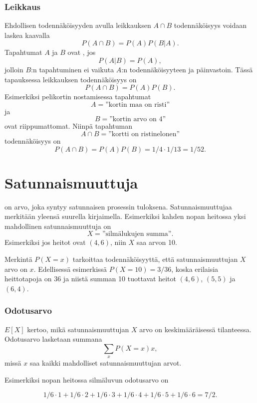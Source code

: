 \subsubsection{Leikkaus}


Ehdollisen todennäköisyyden avulla
leikkauksen $A \cap B$ todennäköisyys
voidaan laskea kaavalla
\[P(A \cap B)=P(A)P(B|A).\]
Tapahtumat $A$ ja $B$ ovat , jos
\[P(A|B)=P(A),\]
jolloin $B$:n tapahtuminen ei vaikuta $A$:n
todennäköisyyteen ja päinvastoin.
Tässä tapauksessa leikkauksen
todennäköisyys on
\[P(A \cap B)=P(A)P(B).\]
Esimerkiksi pelikortin nostamisessa
tapahtumat
\[A = \textrm{''kortin maa on risti''}\]
ja
\[B = \textrm{''kortin arvo on 4''}\]
ovat riippumattomat.
Niinpä tapahtuman
\[A \cap B = \textrm{''kortti on ristinelonen''}\]
todennäköisyys on
\[P(A \cap B)=P(A)P(B)=1/4 \cdot 1/13 = 1/52.\]

\section{Satunnaismuuttuja}


 on arvo, joka syntyy satunnaisen
prosessin tuloksena.
Satunnaismuuttujaa merkitään yleensä
suurella kirjaimella.
Esimerkiksi kahden nopan heitossa yksi mahdollinen
satunnaismuuttuja on
\[X=\textrm{''silmälukujen summa''}.\]
Esimerkiksi jos heitot ovat $(4,6)$,
niin $X$ saa arvon 10.

Merkintä $P(X=x)$ tarkoittaa todennäköisyyttä,
että satunnaismuuttujan $X$ arvo on $x$.
Edellisessä esimerkissä $P(X=10)=3/36$,
koska erilaisia heittotapoja on 36
ja niistä summan 10 tuottavat heitot
$(4,6)$, $(5,5)$ ja $(6,4)$.

\subsubsection{Odotusarvo}


 $E[X]$ kertoo, mikä satunnaismuuttujan $X$
arvo on keskimääräisessä tilanteessa.
Odotusarvo lasketaan summana
\[\sum_x P(X=x)x,\]
missä $x$ saa kaikki mahdolliset satunnaismuuttujan arvot.

Esimerkiksi nopan heitossa silmäluvun odotusarvo on

\[1/6 \cdot 1 + 1/6 \cdot 2 + 1/6 \cdot 3 + 1/6 \cdot 4 + 1/6 \cdot 5 + 1/6 \cdot 6 = 7/2.\]

